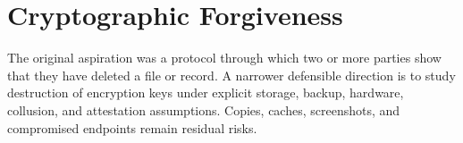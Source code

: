 \chapter{Cryptographic Forgiveness}
\label{app:cryptographic-forgiveness}


The original aspiration was a protocol through which two or more parties show
that they have deleted a file or record. A narrower defensible direction is to
study destruction of encryption keys under explicit storage, backup, hardware,
collusion, and attestation assumptions. Copies, caches, screenshots, and
compromised endpoints remain residual risks.
